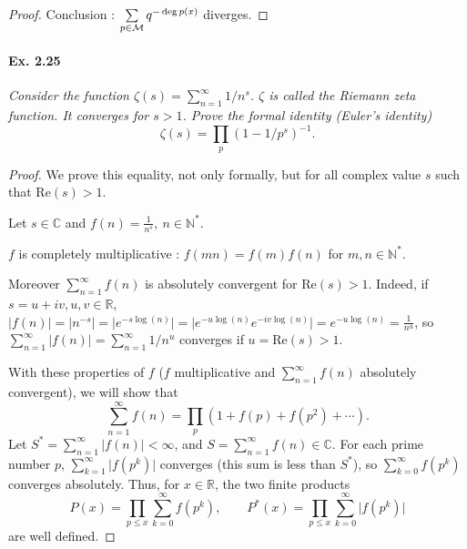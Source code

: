\documentclass[11pt,a4paper]{article}
\newcommand{\N}{\mathbb{N}}
\newcommand{\R}{\mathbb{R}}
\newcommand{\C}{\mathbb{C}}
\begin{document}
{\begin{proof}
Conclusion :  $\sum\limits_{p \in {\cal M}} q^{-\deg p(x)}$ diverges.
\end{proof}

\paragraph{Ex. 2.25}

{\it Consider the function $\zeta(s) = \sum_{n=1}^\infty 1/n^s$. $\zeta$ is called the Riemann zeta function. It converges for $s > 1$. Prove the formal identity (Euler's identity) $$\zeta(s) = \prod_p (1-1/p^s)^{-1}.$$
}

\begin{proof}
We prove this equality, not only formally, but for all complex value $s$ such that $\mathrm{Re}(s)>1$.

Let $s \in \C$ and $f(n) = \frac{1}{n^s},\ n\in \N^*$. 

$f$ is completely multiplicative : $f(mn) = f(m) f(n)$ for $m,n \in \N^*$. 

Moreover  $\sum_{n=1}^\infty f(n)$ is absolutely convergent for $\mathrm{Re}(s) > 1$. Indeed, if $s = u+iv, u,v \in \R$, $\vert f(n) \vert = \vert n^{-s}\vert = \vert e^{-s \log(n)} \vert = \vert e^{-u \log(n)} e^{-iv \log(n)} \vert = e^{-u \log(n)} = \frac{1}{n^u}$, so $\sum\limits_{n=1}^\infty \vert f(n) \vert=\sum\limits_{n=1}^\infty 1/n^u$ converges if $u=\mathrm{Re}(s) >1$.

With these properties of $f$ ($f$ multiplicative and $\sum_{n=1}^\infty f(n)$  absolutely convergent), we will show that 
$$\sum_{n=1}^\infty f(n) = \prod_p (1 +f(p)+f(p^2)+\cdots).$$
Let $S^* = \sum\limits_{n = 1}^\infty \vert f(n) \vert < \infty$, and $S = \sum\limits_{n = 1}^\infty  f(n) \in \C$. For each prime number $p$, $\sum\limits_{k=1}^\infty \vert f(p^k) \vert$ converges (this sum is less than  $S^*$), so $\sum\limits_{k=0}^\infty f(p^k)$ converges absolutely. Thus, for $x \in \R$, the two finite products
$$P(x) = \prod_{p\leq x }\sum_{k=0}^\infty f(p^k), \qquad P^*(x) =  \prod_{p\leq x} \sum_{k=0}^\infty \vert f(p^k) \vert$$
are well defined.


\end{proof}}
\end{document}

